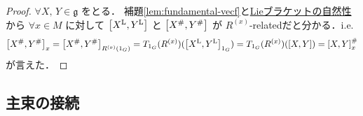 \documentclass[TQFT_main]{subfiles}
\begin{document}
\begin{proof}
    $\forall X,\, Y \in \mathfrak{g}$ をとる．
    補題\ref{lem:fundamental-vecf}と\hyperref[prop:Lie-bracket-natural]{Lieブラケットの自然性}から $\forall x \in M$ に対して $\comm{\Lie{X}}{\Lie{Y}}$ と $\comm{X^\#}{Y^\#}$ が $R^{(x)}$-relatedだと分かる．i.e.
    \begin{align}
        \comm{X^\#}{Y^\#}_x = \comm{X^\#}{Y^\#}_{R^{(x)}(1_G)} = T_{1_G} (R^{(x)}) (\comm{\Lie{X}}{\Lie{Y}}_{1_G}) = T_{1_G} (R^{(x)}) (\comm{X}{Y}) = \comm{X}{Y}^\#_x
    \end{align}
    が言えた．
\end{proof}


\subsection{主束の接続}
\end{document}

